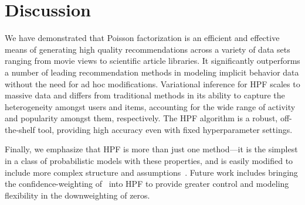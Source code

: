 \section{Discussion}
We have demonstrated that Poisson factorization is an efficient and
effective means of generating high quality recommendations across a
variety of data sets ranging from movie views to scientific article
libraries. It significantly outperforms a number of leading
recommendation methods in modeling implicit behavior data without the
need for ad hoc modifications. Variational inference for HPF scales to
massive data and differs from traditional methods in its ability to
capture the heterogeneity amongst users and items, accounting for the
wide range of activity and popularity amongst them, respectively. The
HPF algorithm is a robust, off-the-shelf tool, providing high accuracy
even with fixed hyperparameter settings.


Finally, we emphasize that HPF is more than just one method---it is
the simplest in a class of probabilistic models with these properties,
and is easily modified to include more complex structure and
assumptions~\cite{gopalan2014content,gopalan2014bayesian}.  Future
work includes bringing the confidence-weighting of~\cite{Hu:2008p9402}
into HPF to provide greater control and modeling flexibility in the
downweighting of zeros.






